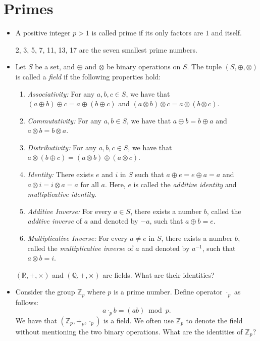 \documentclass{article}
\begin{document}
\section{Primes}
\begin{itemize}
\item A positive integer $p > 1$ is called prime if its only factors are $1$ and itself.

2, 3, 5, 7, 11, 13, 17 are the seven smallest prime numbers.

\item Let $S$ be a set, and $\oplus$ and $\otimes$ be binary operations on $S$. The tuple $(S, \oplus, \otimes)$ is called a \emph{field} if the following properties hold:
\begin{enumerate}
\item \emph{Associativity:} For any $a,b,c \in S$, we have that $(a \oplus b) \oplus c = a \oplus (b \oplus c)$ and $(a \otimes b) \otimes c = a \otimes (b \otimes c)$.
\item \emph{Commutativity:} For any $a, b \in S$, we have that $a \oplus b = b \oplus a$ and $a \otimes b = b \otimes a$.
\item \emph{Distributivity:} For any $a, b, c \in S$, we have that $a \otimes ( b \oplus c) = (a \otimes b) \oplus (a \otimes c)$.
\item \emph{Identity:} There exists $e$ and $i$ in $S$ such that $a \oplus e = e \oplus a = a$ and $a \otimes i = i \otimes a = a$ for all $a$. Here, $e$ is called the \emph{additive identity} and \emph{multiplicative identity}.
\item \emph{Additive Inverse:} For every $a \in S$, there exists a number $b$, called the \emph{addtive inverse} of $a$ and denoted by $-a$, such that $a \oplus b = e$.
\item \emph{Multiplicative Inverse:} For every $a \neq e$ in $S$, there exists a number $b$, called the \emph{multiplicative inverse} of $a$ and denoted by $a^{-1}$, such that $a \otimes b = i$.
\end{enumerate}

$(\mathbb{R}, +, \times)$ and $(\mathbb{Q}, +, \times)$ are fields. What are their identities?

\item Consider the group $\mathbb{Z}_p$ where $p$ is a prime number. Define operator $\cdot_p$ as follows: $$a \cdot_p b = (ab) \bmod p.$$ We have that $(\mathbb{Z}_p, +_p, \cdot_p)$ is a field. We often use $\mathbb{Z}_p$ to denote the field without mentioning the two binary operations. What are the identities of $\mathbb{Z}_p$?


\end{itemize}
\end{document}
